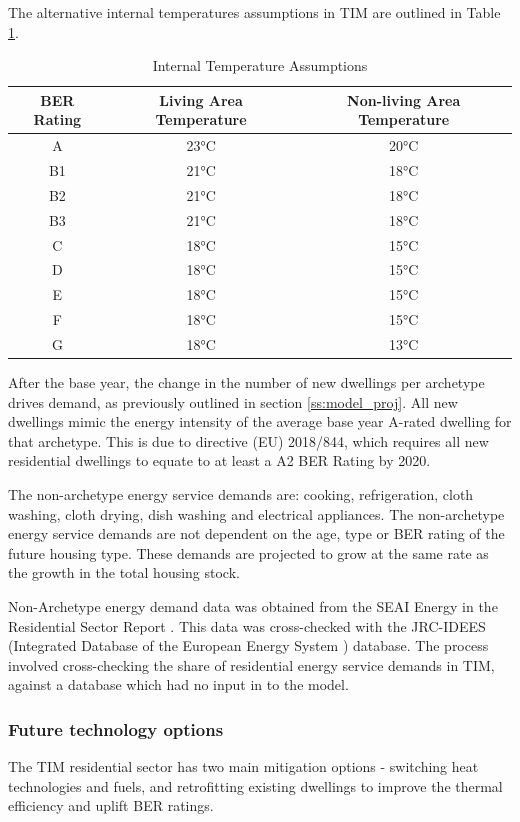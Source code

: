 \documentclass[journal abbreviation, manuscript]{copernicus}
\begin{document}
The alternative internal temperatures assumptions in TIM are outlined in Table \ref{Internal Temperature Assumptions}. 

\begin{table}[h!]
 \centering
 \footnotesize
 \caption{Internal Temperature Assumptions}
 \begin{tabular}{ccc}
 \hline 
 BER Rating & Living Area Temperature & Non-living Area Temperature \\
 \hline
 A & 23°C & 20°C \\
 B1 & 21°C & 18°C \\
 B2	& 21°C & 18°C \\
 B3 & 21°C & 18°C \\
 C & 18°C & 15°C \\
 D & 18°C & 15°C \\
 E & 18°C & 15°C \\
 F & 18°C & 15°C \\
 G & 18°C & 13°C \\ \hline
 \end{tabular}
 
 \label{Internal Temperature Assumptions}
\end{table}

After the base year, the change in the number of new dwellings per archetype drives demand, as previously outlined in section \ref{ss:model_proj}. All new dwellings mimic the energy intensity of the average base year A-rated dwelling for that archetype. This is due to directive (EU) 2018/844, which requires all new residential dwellings to equate to at least a A2 BER Rating by 2020. 

The non-archetype energy service demands are: cooking, refrigeration, cloth washing, cloth drying, dish washing and electrical appliances. The non-archetype energy service demands are not dependent on the age, type or BER rating of the future housing type. These demands are projected to grow at the same rate as the growth in the total housing stock. 

Non-Archetype energy demand data was obtained from the SEAI Energy in the Residential Sector Report \cite{SEAISustainableAuthorityofIreland2018}. This data was cross-checked with the JRC-IDEES (Integrated Database of the European Energy System ) database. The process involved cross-checking the share of residential energy service demands in TIM, against a database which had no input in to the model.

\subsubsection{Future technology options}
The TIM residential sector has two main mitigation options - switching heat technologies and fuels, and retrofitting existing dwellings to improve the thermal efficiency and uplift BER ratings. 
\end{document}
